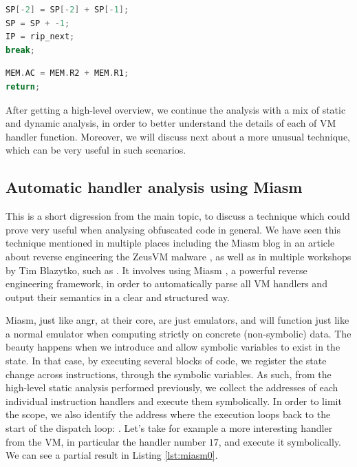 \begin{multicols}{2}
    \begin{lstlisting}[language=c, label={lst:add_vmwhere}, caption={Stack-based implementation of a simple \cc{add} instruction in the \cc{vmwhere} architecture.}]
SP[-2] = SP[-2] + SP[-1];
SP = SP + -1;
IP = rip_next;
break;
\end{lstlisting}
\columnbreak
\begin{lstlisting}[language=c, label={lst:add_vmcastle}, caption={Register-based implementation of a simple \cc{add} instruction in the \cc{vmcastle} architecture.}]
MEM.AC = MEM.R2 + MEM.R1;
return;
\end{lstlisting}
\end{multicols}

After getting a high-level overview, we continue the analysis with a mix of static and dynamic analysis, in order to better understand the details of each of \gls{VM} handler function. Moreover, we will discuss next about a more unusual technique, which can be very useful in such scenarios.

\subsection{Automatic handler analysis using Miasm}
\label{sec:miasm}


This is a short digression from the main topic, to discuss a technique which could prove very useful when analysing obfuscated code in general. We have seen this technique mentioned in multiple places including the Miasm blog in an article about reverse engineering the ZeusVM malware \cite{zeusvm_miasm}, as well as in multiple workshops by Tim Blazytko, such as \cite{tim_miasm}. It involves using Miasm \cite{miasm}, a powerful reverse engineering framework, in order to automatically parse all \gls{VM} handlers and output their semantics in a clear and structured way. 

Miasm, just like angr, at their core, are just emulators, and will function just like a normal emulator when computing strictly on concrete (non-symbolic) data. The beauty happens when we introduce and allow symbolic variables to exist in the state. In that case, by executing several blocks of code, we register the state change across instructions, through the symbolic variables. As such, from the high-level static analysis performed previously, we collect the addresses of each individual instruction handlers and execute them symbolically. In order to limit the scope, we also identify the address where the execution loops back to the start of the dispatch loop: . Let's take for example a more interesting handler from the  \gls{VM}, in particular the handler number $17$, and execute it symbolically. We can see a partial result in Listing \ref{lst:miasm0}. 

